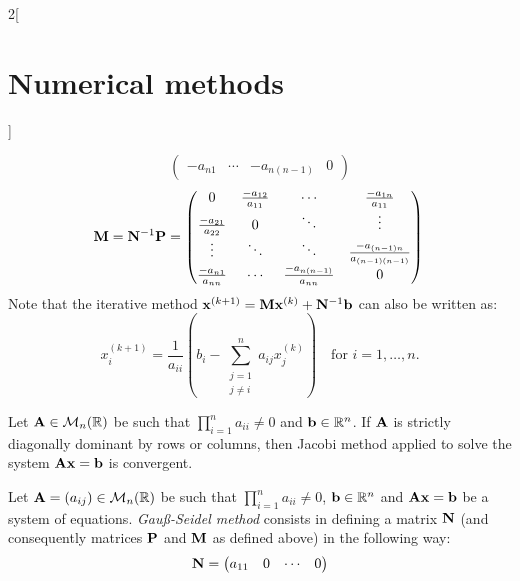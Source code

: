 \documentclass[../../../main.tex]{subfiles}
\begin{document}
\begin{multicols}{2}[\section{Numerical methods}]
\begin{definition}
\begin{equation*}
\begin{pmatrix}
                -a_{n1} & \cdots  & -a_{n(n-1)} & 0
            \end{pmatrix}
        \end{equation*}
        \begin{equation*}
            \vb{M}=\vb{N}^{-1}\vb{P}=
            \begin{pmatrix}
                0                      & \frac{-a_{12}}{a_{11}} & \cdots                     & \frac{-a_{1n}}{a_{11}}             \\
                \frac{-a_{21}}{a_{22}} & 0                      & \ddots                     & \vdots                             \\
                \vdots                 & \ddots                 & \ddots                     & \frac{-a_{(n-1)n}}{a_{(n-1)(n-1)}} \\
                \frac{-a_{n1}}{a_{nn}} & \cdots                 & \frac{-a_{n(n-1)}}{a_{nn}} & 0
            \end{pmatrix}\\
        \end{equation*}
        Note that the iterative method $\vb{x}^{(k+1)}=\vb{M}\vb{x}^{(k)}+\vb{N}^{-1}\vb{b}$ can also be written as: $$x_i^{(k+1)}=\frac{1}{a_{ii}}\left(b_i-\sum_{\substack{j=1\\j\ne i}}^na_{ij}x_j^{(k)}\right)\quad\text{for }i=1,\ldots,n.$$
    \end{definition}
    \begin{theorem}
        Let $\vb{A}\in\mathcal{M}_n(\mathbb{R})$ be such that $\prod_{i=1}^na_{ii}\ne 0$ and $\vb{b}\in\mathbb{R}^n$. If $\vb{A}$ is strictly diagonally dominant by rows or columns, then Jacobi method applied to solve the system $\vb{A}\vb{x}=\vb{b}$ is convergent.
    \end{theorem}
    \begin{definition}
        Let $\vb{A}=(a_{ij})\in\mathcal{M}_n(\mathbb{R})$ be such that $\prod_{i=1}^na_{ii}\ne 0$, $\vb{b}\in\mathbb{R}^n$ and $\vb{A}\vb{x}=\vb{b}$ be a system of equations. \textit{Gau\ss-Seidel method} consists in defining a matrix $\vb{N}$ (and consequently matrices $\vb{P}$ and $\vb{M}$ as defined above) in the following way:
        \begin{equation*}
            \vb{N}=
            \begin{pmatrix}
                a_{11} & 0      & \cdots     & 0      \\

\end{pmatrix}
\end{equation*}
\end{definition}
\end{multicols}
\end{document}
